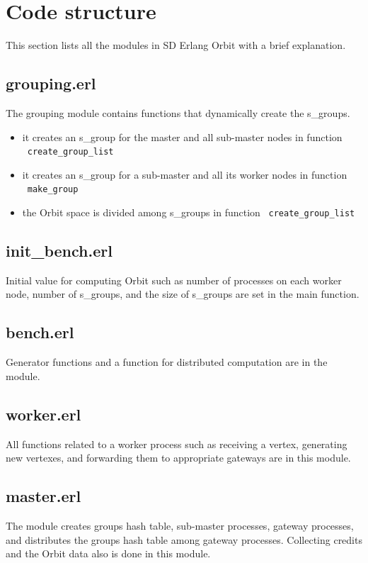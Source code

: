 \documentclass[11pt,a4paper]{article}
\begin{document}
\section{Code structure}

This section lists all the modules in SD Erlang Orbit with a brief explanation.

\subsection*{grouping.erl}
The grouping module contains functions that dynamically create the s\_groups.
\begin{itemize}
\item it creates an s\_group for the master and all sub-master nodes in function ~\texttt{create\_group\_list}
\item it creates an s\_group for a sub-master and all its worker nodes in function ~\texttt{make\_group}
\item the Orbit space is divided among s\_groups in function ~\texttt{create\_group\_list}
\end{itemize}

\subsection*{init\_bench.erl}
Initial value for computing Orbit such as number of processes on each worker node, number of s\_groups, and the size of s\_groups are set in the main function.

\subsection*{bench.erl}
Generator functions and a function for distributed computation are in the module.

\subsection*{worker.erl}
All functions related to a worker process such as receiving a vertex, generating new vertexes, and forwarding them to appropriate gateways are in this module.

\subsection*{master.erl}
The module creates groups hash table, sub-master processes, gateway processes, and distributes the groups hash table among gateway processes. Collecting credits and the Orbit data also is done in this module.
\end{document}
